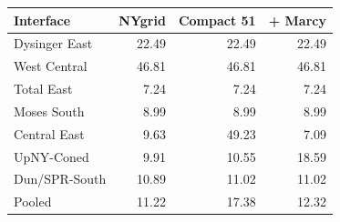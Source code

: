 \begin{tabular}{lrrr}
\toprule
Interface & NYgrid & Compact 51 & + Marcy \\
\midrule
Dysinger East & 22.49 & 22.49 & 22.49 \\
West Central & 46.81 & 46.81 & 46.81 \\
Total East & 7.24 & 7.24 & 7.24 \\
Moses South & 8.99 & 8.99 & 8.99 \\
Central East & 9.63 & 49.23 & 7.09 \\
UpNY-Coned & 9.91 & 10.55 & 18.59 \\
Dun/SPR-South & 10.89 & 11.02 & 11.02 \\
\midrule Pooled & 11.22 & 17.38 & 12.32 \\
\bottomrule
\end{tabular}
